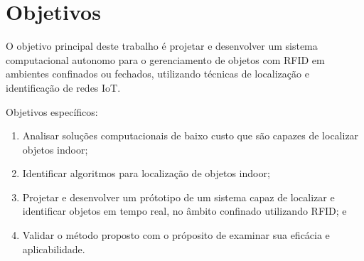\section{Objetivos}
O objetivo principal deste trabalho é projetar e desenvolver um sistema computacional autonomo para o gerenciamento de objetos com RFID 
em ambientes confinados ou fechados, utilizando técnicas de localização e identificação de redes IoT.


Objetivos específicos:
\begin{enumerate}

    \item Analisar soluções computacionais de baixo custo que são capazes de localizar objetos indoor;
    
    \item Identificar algoritmos para localização de objetos indoor;
    
    
    
    \item Projetar e desenvolver um prótotipo de um sistema capaz de localizar e identificar objetos em tempo real, no âmbito confinado utilizando RFID; e
    
    \item Validar o método proposto com o próposito de examinar sua eficácia e aplicabilidade.
\end{enumerate}


